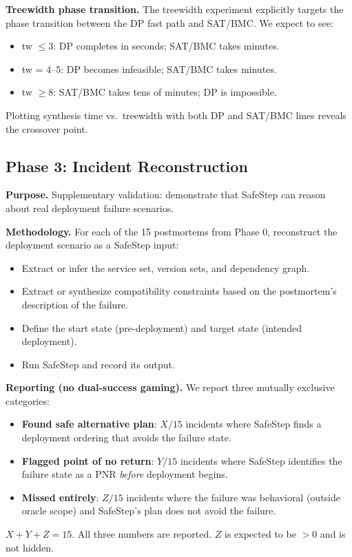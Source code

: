 \documentclass[10pt,twocolumn]{article}
\begin{document}
\textbf{Treewidth phase transition.} The treewidth experiment explicitly targets the phase transition between the DP fast path and SAT/BMC. We expect to see:
\begin{itemize}
\item tw $\leq 3$: DP completes in seconds; SAT/BMC takes minutes.
\item tw = 4--5: DP becomes infeasible; SAT/BMC takes minutes.
\item tw $\geq 8$: SAT/BMC takes tens of minutes; DP is impossible.
\end{itemize}
Plotting synthesis time vs.\ treewidth with both DP and SAT/BMC lines reveals the crossover point.

\subsection{Phase 3: Incident Reconstruction}
\label{sec:eval-incidents}

\textbf{Purpose.} Supplementary validation: demonstrate that SafeStep can reason about real deployment failure scenarios.

\textbf{Methodology.} For each of the 15 postmortems from Phase 0, reconstruct the deployment scenario as a SafeStep input:
\begin{itemize}
\item Extract or infer the service set, version sets, and dependency graph.
\item Extract or synthesize compatibility constraints based on the postmortem's description of the failure.
\item Define the start state (pre-deployment) and target state (intended deployment).
\item Run SafeStep and record its output.
\end{itemize}

\textbf{Reporting (no dual-success gaming).} We report three mutually exclusive categories:
\begin{itemize}
\item \textbf{Found safe alternative plan}: $X/15$ incidents where SafeStep finds a deployment ordering that avoids the failure state.
\item \textbf{Flagged point of no return}: $Y/15$ incidents where SafeStep identifies the failure state as a PNR \emph{before} deployment begins.
\item \textbf{Missed entirely}: $Z/15$ incidents where the failure was behavioral (outside oracle scope) and SafeStep's plan does not avoid the failure.
\end{itemize}
$X + Y + Z = 15$. All three numbers are reported. $Z$ is expected to be $> 0$ and is not hidden.
\end{document}
